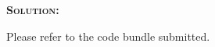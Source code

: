 \documentclass[answers]{exam}
\renewenvironment{solution}{\textsc{\textbf{Solution:}} \par}{}
\begin{document}
\begin{questions}

	
	
	

	\question
	\begin{solution}
		Please refer to the code bundle submitted.
	\end{solution}
\end{questions}
\end{document}
